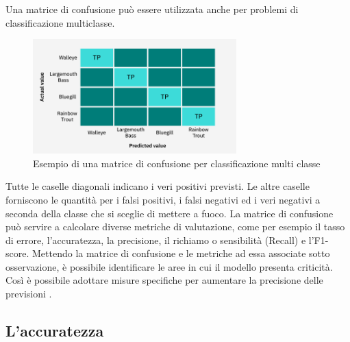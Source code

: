 \newpage
Una matrice di confusione può essere utilizzata anche per problemi di 
classificazione multiclasse. 

\begin{figure}[H]
    \centering
    \includegraphics[width=0.70\textwidth]{Immagini/Grafici/esempio_MC_2.png}
    \caption{Esempio di una matrice di confusione per classificazione multi classe}
\end{figure}

Tutte le caselle diagonali indicano i veri positivi previsti. 
Le altre caselle forniscono le quantità per i falsi positivi, i falsi 
negativi ed i veri negativi a seconda della classe che si sceglie di mettere a fuoco.
La matrice di confusione può servire a calcolare diverse metriche di valutazione, 
come per esempio il tasso di errore, l’accuratezza, la precisione, 
il richiamo o sensibilità (Recall) e l’F1-score.
Mettendo la matrice di confusione e le metriche ad essa associate sotto osservazione, 
è possibile identificare le aree in cui il modello presenta criticità. 
Così è possibile adottare misure specifiche per aumentare la precisione 
delle previsioni \cite{Confusion_Matrix_e_metrics1,Confusion_Matrix_e_metrics2}.

\subsection{L'accuratezza}


